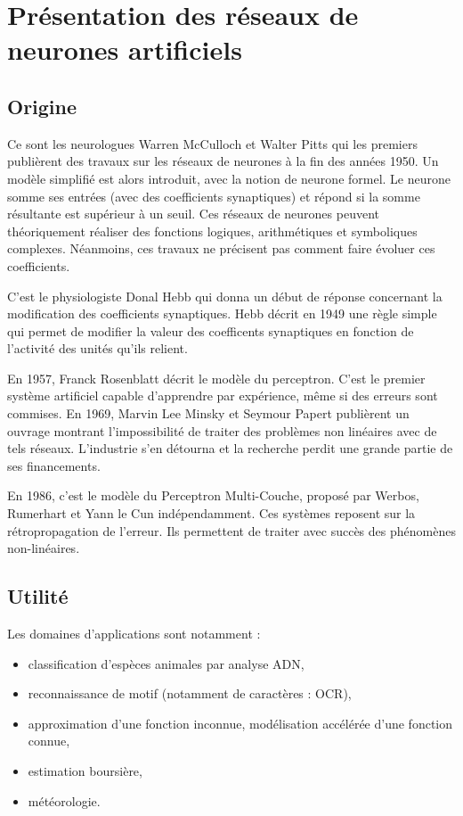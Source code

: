 \section{Pr\'esentation des r\'eseaux de neurones artificiels}

	\subsection{Origine}

Ce sont les neurologues Warren McCulloch et Walter Pitts qui les premiers publi\`erent des travaux sur les r\'eseaux de neurones \`a la fin des ann\'ees 1950. Un mod\`ele simplifi\'e est alors introduit, avec la notion de neurone formel. Le neurone somme ses entr\'ees (avec des coefficients synaptiques) et r\'epond si la somme r\'esultante est sup\'erieur \`a un seuil. Ces r\'eseaux de neurones peuvent th\'eoriquement r\'ealiser des fonctions logiques, arithm\'etiques et symboliques complexes. N\'eanmoins, ces travaux ne pr\'ecisent pas comment faire \'evoluer ces coefficients.

C'est le physiologiste Donal Hebb qui donna un d\'ebut de r\'eponse concernant la modification des coefficients synaptiques. Hebb d\'ecrit en 1949 une r\`egle simple qui permet de modifier la valeur des coefficents synaptiques en fonction de l'activit\'e des unit\'es qu'ils relient.

En 1957, Franck Rosenblatt d\'ecrit le mod\`ele du perceptron. C'est le premier syst\`eme artificiel capable d'apprendre par exp\'erience, m\^eme si des erreurs sont commises. En 1969, Marvin Lee Minsky et Seymour Papert publi\`erent un ouvrage montrant l'impossibilit\'e de traiter des probl\`emes non lin\'eaires avec de tels r\'eseaux. L'industrie s'en d\'etourna et la recherche perdit une grande partie de ses financements.

En 1986, c'est le mod\`ele du Perceptron Multi-Couche, propos\'e par Werbos, Rumerhart et Yann le Cun ind\'ependamment. Ces syst\`emes reposent sur la r\'etropropagation de l'erreur. Ils permettent de traiter avec succ\`es des ph\'enom\`enes non-lin\'eaires.

	\subsection{Utilit\'e}

Les domaines d'applications sont notamment :
\begin{itemize}
	\item classification d'esp\`eces animales par analyse ADN,
	\item reconnaissance de motif (notamment de caract\`eres : OCR),
	\item approximation d'une fonction inconnue, mod\'elisation acc\'el\'er\'ee d'une fonction connue,
	\item estimation boursi\`ere,
	\item m\'et\'eorologie.
\end{itemize}

